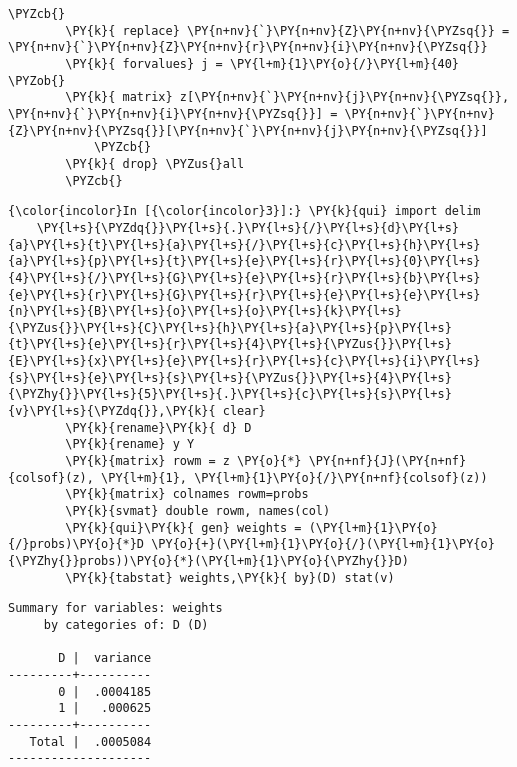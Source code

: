 \documentclass[11pt,notitlepage]{article}\usepackage[]{graphicx}\usepackage[]{color}
\makeatletter
\newenvironment{kframe}{%
 \def\at@end@of@kframe{}%
 \ifinner\ifhmode%
  \def\at@end@of@kframe{\end{minipage}}%
  \begin{minipage}{\columnwidth}%
 \fi\fi%
 \def\FrameCommand##1{\hskip\@totalleftmargin \hskip-\fboxsep
 \colorbox{shadecolor}{##1}\hskip-\fboxsep
     \hskip-\linewidth \hskip-\@totalleftmargin \hskip\columnwidth}%
 \MakeFramed {\advance\hsize-\width
   \@totalleftmargin\z@ \linewidth\hsize
   \@setminipage}}%
 {\par\unskip\endMakeFramed%
 \at@end@of@kframe}
\newenvironment{knitrout}{}{} %
\makeatother
\begin{document}
\begin{enumerate}[a)]
\begin{knitrout}
\begin{kframe}
\begin{Verbatim}[commandchars=\\\{\}]
        	\PYZcb{}
        \PY{k}{	replace} \PY{n+nv}{`}\PY{n+nv}{Z}\PY{n+nv}{\PYZsq{}} = \PY{n+nv}{`}\PY{n+nv}{Z}\PY{n+nv}{r}\PY{n+nv}{i}\PY{n+nv}{\PYZsq{}}
        \PY{k}{	forvalues} j = \PY{l+m}{1}\PY{o}{/}\PY{l+m}{40} \PYZob{}
        \PY{k}{	matrix} z[\PY{n+nv}{`}\PY{n+nv}{j}\PY{n+nv}{\PYZsq{}}, \PY{n+nv}{`}\PY{n+nv}{i}\PY{n+nv}{\PYZsq{}}] = \PY{n+nv}{`}\PY{n+nv}{Z}\PY{n+nv}{\PYZsq{}}[\PY{n+nv}{`}\PY{n+nv}{j}\PY{n+nv}{\PYZsq{}}]
        	\PYZcb{}
        \PY{k}{	drop} \PYZus{}all
        \PYZcb{}
\end{Verbatim}

    \begin{Verbatim}[commandchars=\\\{\}]
{\color{incolor}In [{\color{incolor}3}]:} \PY{k}{qui} import delim 
	\PY{l+s}{\PYZdq{}}\PY{l+s}{.}\PY{l+s}{/}\PY{l+s}{d}\PY{l+s}{a}\PY{l+s}{t}\PY{l+s}{a}\PY{l+s}{/}\PY{l+s}{c}\PY{l+s}{h}\PY{l+s}{a}\PY{l+s}{p}\PY{l+s}{t}\PY{l+s}{e}\PY{l+s}{r}\PY{l+s}{0}\PY{l+s}{4}\PY{l+s}{/}\PY{l+s}{G}\PY{l+s}{e}\PY{l+s}{r}\PY{l+s}{b}\PY{l+s}{e}\PY{l+s}{r}\PY{l+s}{G}\PY{l+s}{r}\PY{l+s}{e}\PY{l+s}{e}\PY{l+s}{n}\PY{l+s}{B}\PY{l+s}{o}\PY{l+s}{o}\PY{l+s}{k}\PY{l+s}{\PYZus{}}\PY{l+s}{C}\PY{l+s}{h}\PY{l+s}{a}\PY{l+s}{p}\PY{l+s}{t}\PY{l+s}{e}\PY{l+s}{r}\PY{l+s}{4}\PY{l+s}{\PYZus{}}\PY{l+s}{E}\PY{l+s}{x}\PY{l+s}{e}\PY{l+s}{r}\PY{l+s}{c}\PY{l+s}{i}\PY{l+s}{s}\PY{l+s}{e}\PY{l+s}{s}\PY{l+s}{\PYZus{}}\PY{l+s}{4}\PY{l+s}{\PYZhy{}}\PY{l+s}{5}\PY{l+s}{.}\PY{l+s}{c}\PY{l+s}{s}\PY{l+s}{v}\PY{l+s}{\PYZdq{}},\PY{k}{ clear}
        \PY{k}{rename}\PY{k}{ d} D
        \PY{k}{rename} y Y
        \PY{k}{matrix} rowm = z \PY{o}{*} \PY{n+nf}{J}(\PY{n+nf}{colsof}(z), \PY{l+m}{1}, \PY{l+m}{1}\PY{o}{/}\PY{n+nf}{colsof}(z))
        \PY{k}{matrix} colnames rowm=probs
        \PY{k}{svmat} double rowm, names(col)       
        \PY{k}{qui}\PY{k}{ gen} weights = (\PY{l+m}{1}\PY{o}{/}probs)\PY{o}{*}D \PY{o}{+}(\PY{l+m}{1}\PY{o}{/}(\PY{l+m}{1}\PY{o}{\PYZhy{}}probs))\PY{o}{*}(\PY{l+m}{1}\PY{o}{\PYZhy{}}D)        
        \PY{k}{tabstat} weights,\PY{k}{ by}(D) stat(v)
\end{Verbatim}

    \begin{Verbatim}[commandchars=\\\{\}]
Summary for variables: weights
     by categories of: D (D)

       D |  variance
---------+----------
       0 |  .0004185
       1 |   .000625
---------+----------
   Total |  .0005084
--------------------

    \end{Verbatim}
\end{kframe}
\end{knitrout}


\end{enumerate}
\end{document}

